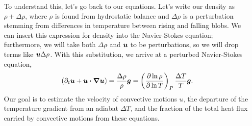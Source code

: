 To understand this, let's go back to our equations.  Let's write our density as $\rho + \Delta\rho$, where $\rho$ is found from hydrostatic balance and $\Delta\rho$ is a perturbation stemming from differences in temperature between rising and falling blobs.   We can insert this expression for density into the Navier-Stokes equation; furthermore, we will take both $\Delta\rho$ and $\boldsymbol{u}$ to be perturbations, so we will drop terms like $\boldsymbol{u}\Delta \rho$. With this substitution, we arrive at a perturbed Navier-Stokes equation,
\begin{equation}\label{e.perturbed-navier-stokes}
 (\partial_{t}\boldsymbol{u} + \boldsymbol{u}\boldsymbol{\cdot}\boldsymbol{\nabla}\boldsymbol{u}) = \frac{\Delta\rho}{\rho}\boldsymbol{g} = \left(\frac{\partial\ln\rho}{\partial\ln T}\right)_{P}\frac{\Delta T}{T}\boldsymbol{g}.
 \end{equation}
Our goal is to estimate the velocity of convective motions $u$, the departure of the temperature gradient from an adiabat $\Delta T$, and the fraction of the total heat flux carried by convective motions from these equations.

